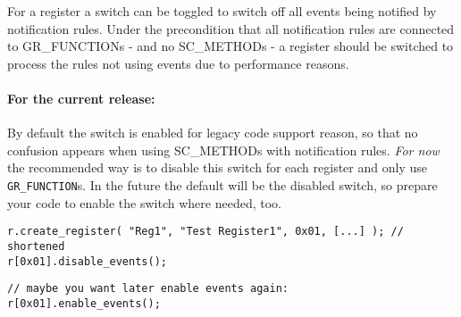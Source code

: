 For a register a switch can be toggled to switch off all events being notified by notification rules.
Under the precondition that all notification rules are connected to {\sffamily GR\_FUNCTION}s - and no {\sffamily SC\_METHOD}s - a register should be switched to process the rules not using events due to performance reasons.


\paragraph{For the current release:} By default the switch is enabled for legacy code support reason, so that no confusion appears when using {\sffamily SC\_METHOD}s with notification rules. {\em For now} the recommended way is to disable this switch for each register and only use \lstinline|GR_FUNCTION|s. In the future the default will be the disabled switch, so prepare your code to enable the switch where needed, too. %

\begin{lstlisting}
r.create_register( "Reg1", "Test Register1", 0x01, [...] ); // shortened
r[0x01].disable_events();
\end{lstlisting}

\begin{lstlisting}
// maybe you want later enable events again:
r[0x01].enable_events();
\end{lstlisting}

